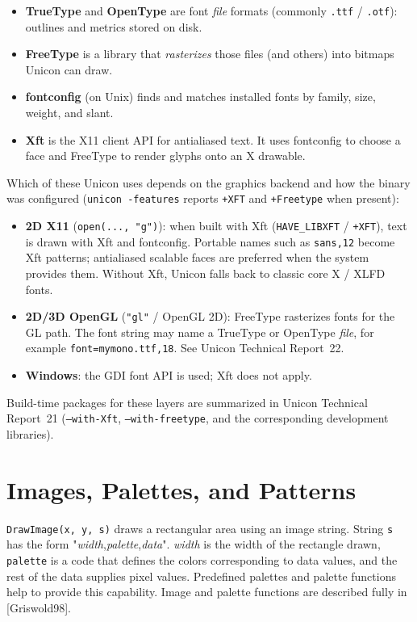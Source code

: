 \begin{itemize}\itemsep0pt
\item \textbf{TrueType} and \textbf{OpenType} are font \emph{file}
  formats (commonly \texttt{.ttf} / \texttt{.otf}): outlines and
  metrics stored on disk.
\item \textbf{FreeType} is a library that \emph{rasterizes} those
  files (and others) into bitmaps Unicon can draw.
\item \textbf{fontconfig} (on Unix) finds and matches installed fonts
  by family, size, weight, and slant.
\item \textbf{Xft} is the X11 client API for antialiased text. It uses
  fontconfig to choose a face and FreeType to render glyphs onto an
  X drawable.
\end{itemize}

Which of these Unicon uses depends on the graphics backend and how
the binary was configured (\texttt{unicon -features} reports
\texttt{+XFT} and \texttt{+Freetype} when present):

\begin{itemize}\itemsep0pt
\item \textbf{2D X11} (\texttt{open(..., "g")}): when built with
  Xft (\texttt{HAVE\_LIBXFT} / \texttt{+XFT}), text is drawn with
  Xft and fontconfig. Portable names such as \texttt{sans,12} become
  Xft patterns; antialiased scalable faces are preferred when the
  system provides them. Without Xft, Unicon falls back to classic
  core X / XLFD fonts.
\item \textbf{2D/3D OpenGL} (\texttt{"gl"} / OpenGL 2D): FreeType
  rasterizes fonts for the GL path. The font string may name a
  TrueType or OpenType \emph{file}, for example
  \texttt{font=mymono.ttf,18}. See Unicon Technical Report~22.
\item \textbf{Windows}: the GDI font API is used; Xft does not apply.
\end{itemize}

Build-time packages for these layers are summarized in Unicon
Technical Report~21 (\texttt{--with-Xft}, \texttt{--with-freetype},
and the corresponding development libraries).

\section{Images, Palettes, and Patterns}

\texttt{DrawImage(x, y, s)} draws a rectangular area using an image
string.  String \texttt{s} has the form
"\textit{width},\textit{palette},\textit{data}".  \textit{width} is
the width of the rectangle drawn, \texttt{palette} is a code that
defines the colors corresponding to data values, and the rest of the
data supplies pixel values. Predefined palettes and palette functions
help to provide this capability. Image and palette functions are
described fully in [Griswold98].

